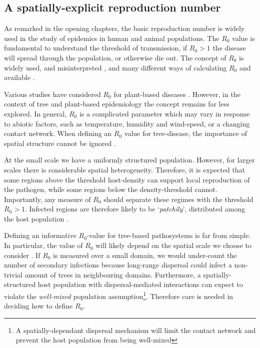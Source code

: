 \begin{fi}
\blindtext %
\newpage



\section{A spatially-explicit reproduction number}

As remarked in the opening chapters, the basic reproduction number is widely used in the %
study of epidemics in human and animal populations. %
The $R_0$ value is fundamental to understand the threshold of transmission, if $R_0>1$ the %
disease will spread through the population, or otherwise die out. The concept of $R_0$ is %
widely used, and misinterpreted \cite{delamater2019complexity}, and many different ways of %
calculating $R_0$ and available \cite{perspectives-on-r0}.

Various studies have considered $R_0$ for plant-based diseases %
\cite{gubbins2000population, park2001invasion, doi:10.1146/annurev.phyto.011108.135838, van2011periodic, mikaberidze2016invasiveness}. %
However, in the context of tree and plant-based epidemiology the concept remains far less %
explored. In general, $R_0$ is a complicated parameter which may vary in response to abiotic %
factors, such as temperature, humidity and wind-speed, or a changing contact network. %
When defining an $R_0$ value for tree-disease, the importance of spatial structure cannot be %
ignored \cite{park2001invasion}.

At the small scale we have a uniformly structured population. %
However, for larger scales there is considerable spatial heterogeneity. %
Therefore, it is expected that some regions above the threshold host-density can support %
local reproduction of the pathogen, while some regions below the density-threshold cannot. %
Importantly, any measure of $R_0$ should separate these regimes with the threshold $R_0>1$. %
Infected regions are therefore likely to be `\textit{patchily}', distributed among the host %
population \cite{park2001invasion}.

Defining an informative $R_0$-value for tree-based pathosystems is far from simple. %
In particular, the value of $R_0$ will likely depend on the spatial scale we choose to %
consider \cite{mikaberidze2016invasiveness}. %
If  $R_0$ is measured over a small domain, we would under-count the number of secondary %
infections because long-range dispersal could infect a non-trivial amount of trees in %
neighbouring domains. %
Furthermore, a spatially-structured host population with dispersal-mediated interactions %
can expect to violate the \textit{well-mixed} population assumption\footnote{A spatially-dependant dispersal mechanism will limit the contact network and prevent the host population from being well-mixed}. 
Therefore care is needed in deciding how to define $R_0$.


\end{fi}
